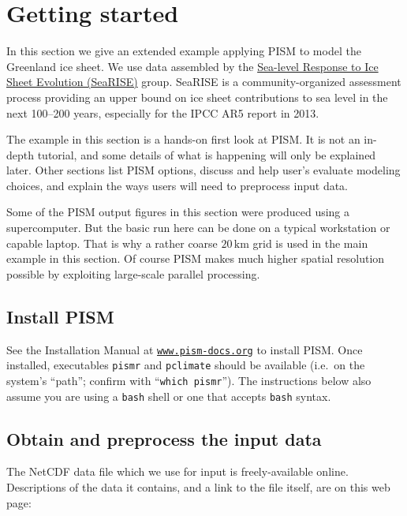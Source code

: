 
\section{Getting started}\label{sec:start}

In this section we give an extended example applying PISM to model the Greenland ice sheet.  We use data assembled by the \href{http://websrv.cs.umt.edu/isis/index.php/SeaRISE_Assessment}{Sea-level Response to Ice Sheet Evolution (SeaRISE)} group.  SeaRISE is a community-organized assessment process providing an upper bound on ice sheet contributions to sea level in the next 100--200 years, especially for the IPCC AR5 report in 2013.

The example in this section is a hands-on first look at PISM.  It is not an in-depth tutorial, and some details of what is happening will only be explained later.  Other sections list PISM options, discuss and help user's evaluate modeling choices, and explain the ways users will need to preprocess input data.

Some of the PISM output figures in this section were produced using a supercomputer.  But the basic run here can be done on a typical workstation or capable laptop.  That is why a rather coarse $20\,\textrm{km}$ grid is used in the main example in this section.  Of course PISM makes much higher spatial resolution possible by exploiting large-scale parallel processing.


\subsection{Install PISM}

See the Installation Manual at \href{http://www.pism-docs.org}{\texttt{www.pism-docs.org}}
to install PISM.  Once installed, executables \texttt{pismr} and \texttt{pclimate} should be available (i.e.~on the system's ``path''; confirm with ``\texttt{which pismr}'').  The instructions below also assume you are using a \texttt{bash} shell or one that accepts \texttt{bash} syntax.


\subsection{Obtain and preprocess the input data}

The NetCDF data file which we use for input is freely-available online.  Descriptions of the data it contains, and a link to the file itself, are on this web page: 
\medskip

